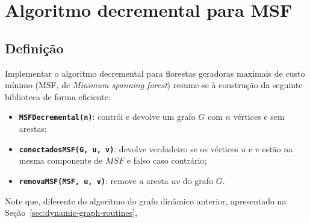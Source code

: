 
\chapter{Algoritmo decremental para MSF}

\enlargethispage{.8\baselineskip}

\section{Definição}
\label{sec:decremental-msf-definition}

Implementar o algoritmo decremental para florestas geradoras maximais de custo mínimo (MSF, de \textit{Minimum spanning forest}) resume-se à construção da seguinte biblioteca de forma eficiente:

\begin{itemize}
    \item \texttt{\textbf{MSFDecremental(n)}}: contrói e devolve um grafo $G$ com $n$ vértices e sem arestas;
    \item \texttt{\textbf{conectadosMSF(G, u, v)}}: devolve verdadeiro se os vértices $u$ e $v$ estão na mesma componente de $MSF$ e falso caso contrário;
    \item \texttt{\textbf{removaMSF(MSF, u, v)}}: remove a aresta $uv$ do grafo $G$.
\end{itemize} 

Note que, diferente do algoritmo do grafo dinâmico anterior, apresentado na Seção~\ref{sec:dynamic-graph-routines}, 
